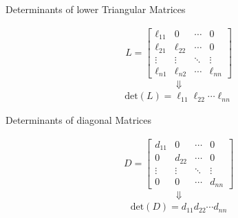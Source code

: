 \documentclass[pdf,9pt]{beamer}
\begin{document}
\begin{frame}
    \begin{center}
      Determinants of \alert{lower} Triangular Matrices
    \end{center}
    \vfill
    \begin{align*}
	L = \left[ \begin{array}{cccc}
		\ell_{11} & 0         & \cdots & 0 \\
		\ell_{21} & \ell_{22} & \cdots & 0 \\
		\vdots    & \vdots    & \ddots & \vdots \\
		\ell_{n1} & \ell_{n2} & \cdots & \ell_{nn}
	\end{array} \right]
    \end{align*}
    \[\Downarrow\]
    \begin{align*}
	\mbox{det}(L) = \ell_{11} \ell_{22} \cdots \ell_{nn}
    \end{align*}
\end{frame}
\begin{frame}
    \begin{center}
      Determinants of \alert{diagonal} Matrices
    \end{center}
    \vfill
    \begin{align*}
	D = \left[ \begin{array}{cccc}
	    d_{11} & 0      & \cdots & 0 \\
	    0      & d_{22} & \cdots & 0 \\
	    \vdots & \vdots & \ddots & \vdots \\
	    0      & 0      & \cdots & d_{nn}
	\end{array} \right]
    \end{align*}
    \[\Downarrow\]
    \begin{align*}
	\mbox{det}(D) = d_{11} d_{22} \cdots d_{nn}
    \end{align*}
\end{frame}
\end{document}
